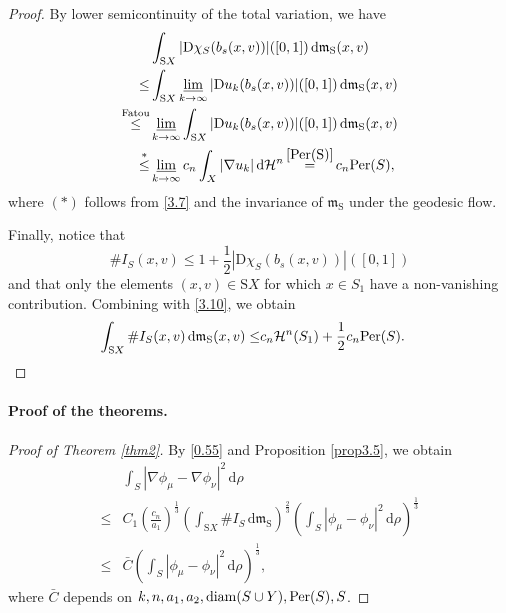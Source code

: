 \documentclass[a4paper,11pt]{article}
\numberwithin{equation}{section}
\theoremstyle{plain}
\theoremstyle{definition}
\theoremstyle{remark}
\newcommand{\mm}{\mathfrak m}
\newcommand{\rS}{\mathrm{S}}
\newcommand{\diam}{\mathop{\rm diam}\nolimits}
\renewcommand{\d}{{\mathrm d}}
\newcommand{\D}{{\mathrm D}}
\newcommand{\limi}{\varliminf}
\begin{document}
\begin{proof}
			
By  lower semicontinuity of the total variation, we have
		\begin{equation}\label{3.10}
		\begin{aligned}
		&\int_{{\rS}X}|\D\chi_S(b_s(x,v))|([0,1])\,\d\mm_\rS(x,v)\\
		\leq &\int_{{\rS}X}\limi_{k\rightarrow\infty}|\D u_k(b_s(x,v))|([0,1])\,\d\mm_\rS(x,v)\\
	\mathop{\leq}^{\text{Fatou}} &\limi_{k\rightarrow\infty}\int_{{\rS}X}|\D u_k(b_s(x,v))|([0,1])\,\d\mm_\rS(x,v)\\
		\mathop{\leq}^* &\limi_{k\rightarrow\infty}c_n \int_X |\nabla u_k|\,\d \mathcal{H}^n \mathop{=}^{\eqref{Per(S)}} c_n{\rm{Per}}(S),
		\end{aligned}
		\end{equation}
			where $(*)$ follows from \eqref{3.7} and the invariance of $\mm_\rS$ under the geodesic flow.
			\medskip
			
	Finally,  notice that
		\begin{equation}\label{36}
		\# I_S(x,v)\leq 1+\frac{1}{2}|\D\chi_S(b_s(x,v))|([0,1])
		\end{equation} and that only the elements $(x,v)\in {\rS}X$ for which $x\in S_1$ have a non-vanishing contribution.  Combining with \eqref{3.10},  we obtain 
	\begin{equation}
		\begin{aligned}
			\int_{{\rS}X}\# I_S(x,v)\,\d\mm_\rS(x,v)
			\leq & c_n\mathcal{H}^n(S_1)+\frac{1}{2}c_n {\rm{Per}}(S).
		\end{aligned}
	\end{equation}
	\end{proof}
	
		\paragraph{Proof of the theorems.}
	\begin{proof}[Proof of Theorem \ref{thm2}]
		By \eqref{0.55} and Proposition \ref{prop3.5}, we obtain
		\begin{equation}
			\begin{aligned}
				&\int_S |\nabla\phi_\mu-\nabla\phi_\nu|^2\,\d\rho\\
				\leq&C_1 \left(\frac{c_n}{a_1}\right)^\frac{1}{3}\left(\int_{{\rS}X}\# I_S\,\d\mm_\rS\right)^\frac{2}{3}\left(\int_S|\phi_\mu-\phi_\nu|^2\,\d\rho\right)^\frac{1}{3}\\
				\leq&	 \bar{C}\left(\int_S|\phi_\mu-\phi_\nu|^2\,\d\rho\right)^\frac{1}{3},
			\end{aligned}
		\end{equation}
		where $\bar{C}$ depends on $k,n,a_1, a_2, \diam(S\cup Y), {\rm{Per}}(S), S$.
	\end{proof}
	
\end{document}
